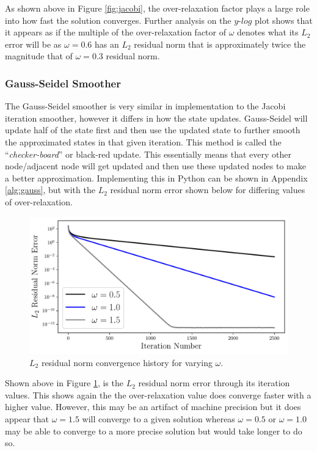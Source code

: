 As shown above in Figure \ref{fig:jacobi}, the over-relaxation factor plays a large role into how fast the solution converges. Further analysis on the $y$-$log$ plot shows that it appears as if the multiple of the over-relaxation factor of $\omega$ denotes what its $L_2$ error will be as $\omega = 0.6$ has an $L_2$ residual norm that is approximately twice the magnitude that of $\omega = 0.3$ residual norm.


\pagebreak
\subsubsection{Gauss-Seidel Smoother}
The Gauss-Seidel smoother is very similar in implementation to the Jacobi iteration smoother, however it differs in how the state updates. Gauss-Seidel will update half of the state first and then use the updated state to further smooth the approximated states in that given iteration. This method is called the ``\textit{checker-board}'' or black-red update. This essentially means that every other node/adjacent node will get updated and then use these updated nodes to make a better approximation. Implementing this in Python can be shown in Appendix \ref{alg:gauss}, but with the $L_2$ residual norm error shown below for differing values of over-relaxation.

\begin{figure}[h]
    \centering
    \includegraphics[width = 0.9\linewidth]{tasks/figs/gauss_l2.pdf}
    \caption[Gauss-Seidel Smoother]{$L_2$ residual norm convergence history for varying $\omega$.}
    \label{fig:gauss}
\end{figure}

Shown above in Figure \ref{fig:gauss}, is the $L_2$ residual norm error through its iteration values. This shows again the the over-relaxation value does converge faster with a higher value. However, this may be an artifact of machine precision but it does appear that $\omega = 1.5$ will converge to a given solution whereas $\omega = 0.5$ or $\omega = 1.0$ may be able to converge to a more precise solution but would take longer to do so.

